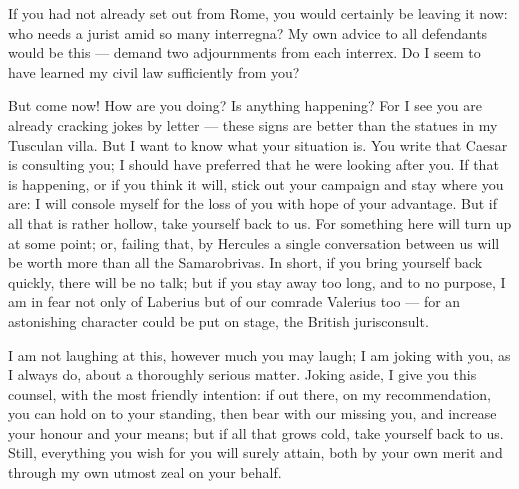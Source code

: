 

 If you had not already set out from Rome, you would certainly be leaving it now: who needs a jurist amid so many interregna? My own advice to all defendants would be this --- demand two adjournments from each interrex. Do I seem to have learned my civil law sufficiently from you?

 But come now! How are you doing? Is anything happening? For I see you are already cracking jokes by letter --- these signs are better than the statues in my Tusculan villa. But I want to know what your situation is. You write that Caesar is consulting you; I should have preferred that he were looking after you. If that is happening, or if you think it will, stick out your campaign and stay where you are: I will console myself for the loss of you with hope of your advantage. But if all that is rather hollow, take yourself back to us. For something here will turn up at some point; or, failing that, by Hercules a single conversation between us will be worth more than all the Samarobrivas. In short, if you bring yourself back quickly, there will be no talk; but if you stay away too long, and to no purpose, I am in fear not only of Laberius but of our comrade Valerius too --- for an astonishing character could be put on stage, the British jurisconsult.

 I am not laughing at this, however much you may laugh; I am joking with you, as I always do, about a thoroughly serious matter. Joking aside, I give you this counsel, with the most friendly intention: if out there, on my recommendation, you can hold on to your standing, then bear with our missing you, and increase your honour and your means; but if all that grows cold, take yourself back to us. Still, everything you wish for you will surely attain, both by your own merit and through my own utmost zeal on your behalf.
